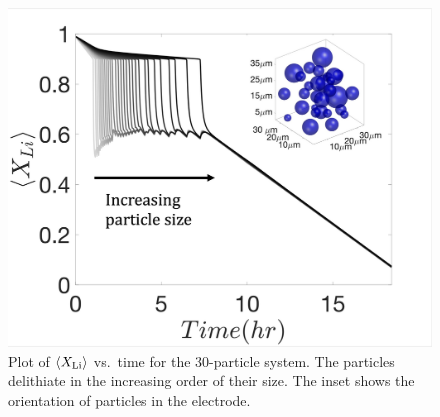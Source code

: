 \documentclass{article}
\begin{document}
\begin{figure}
  \includegraphics{figures/30_particles.png}
  \caption{Plot of $\left<X_{\rm{Li}}\right>$ vs.\ time for the
    30-particle system. The particles delithiate in the increasing
    order of their size. The inset shows the orientation of particles
    in the electrode.}
  \label{fig:30_particles}
\end{figure}




\end{document}
